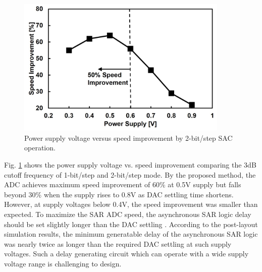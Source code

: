 \begin{figure}
\centering
  \includegraphics[width=0.9\textwidth]{figure/chap4/fig14.jpg}
  \caption{Power supply voltage versus speed improvement by 2-bit/step SAC operation.}
  \label{fig-4-14}
\end{figure}

Fig. \ref{fig-4-14} shows the power supply voltage vs. speed improvement comparing the 3dB cutoff frequency of 1-bit/step and 2-bit/step mode. By the proposed method, the ADC achieves maximum speed improvement of 60\% at 0.5V supply but falls beyond 30\% when the supply rises to 0.8V as DAC settling time shortens. However, at supply voltages below 0.4V, the speed improvement was smaller than expected. To maximize the SAR ADC speed, the asynchronous SAR logic delay should be set slightly longer than the DAC settling \cite{yoshioka-10b-50MS-SAR}. According to the post-layout simulation results, the minimum generatable delay of the asynchronous SAR logic was nearly twice as longer than the required DAC settling at such supply voltages. Such a delay generating circuit which can operate with a wide supply voltage range is challenging to design.


